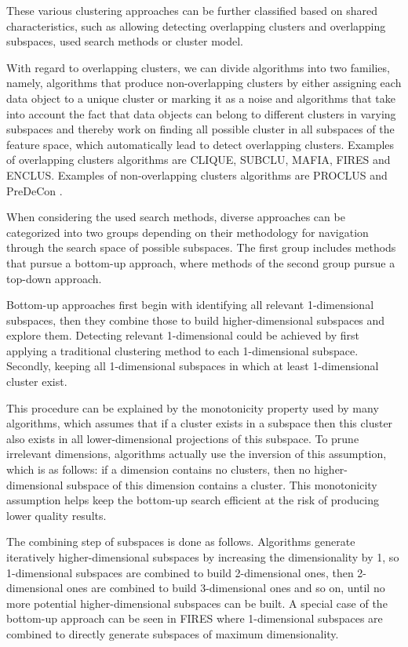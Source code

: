 These various clustering approaches can be further classified based on shared characteristics, such as allowing detecting overlapping clusters and overlapping subspaces, used search methods or cluster model.

With regard to overlapping clusters, we can divide algorithms into two families, namely, algorithms that produce non-overlapping clusters by either assigning each data object to a unique cluster or marking it as a noise and algorithms that take into account the fact that data objects can belong to different clusters in varying subspaces and thereby work on finding all possible cluster in all subspaces of the feature space, which automatically lead to detect overlapping clusters. Examples of overlapping clusters algorithms are CLIQUE, SUBCLU, MAFIA, FIRES and ENCLUS. Examples of non-overlapping clusters algorithms are PROCLUS and PreDeCon \citep{DBLP:conf/icdm/BohmKKK04}.

When considering the used search methods, diverse approaches can be categorized into two groups depending on their methodology for navigation through the search space of possible subspaces. The first group includes methods that pursue a bottom-up approach, where methods of the second group pursue a top-down approach. 

Bottom-up approaches first begin with identifying all relevant 1-dimensional subspaces, then they combine those to build higher-dimensional subspaces and explore them. Detecting relevant 1-dimensional could be achieved by first applying a traditional clustering method to each 1-dimensional subspace. Secondly, keeping all 1-dimensional subspaces in which at least 1-dimensional cluster exist. 

This procedure can be explained by the monotonicity property used by many algorithms, which assumes that if a cluster exists in a subspace then this cluster also exists in all lower-dimensional projections of this subspace. To prune irrelevant dimensions, algorithms actually use the inversion of this assumption, which is as follows: if a dimension contains no clusters, then no higher-dimensional subspace of this dimension contains a cluster. This monotonicity assumption helps keep the bottom-up search efficient at the risk of producing lower quality results.

The combining step of subspaces is done as follows. Algorithms generate iteratively higher-dimensional subspaces by increasing the dimensionality by 1, so 1-dimensional subspaces are combined to build 2-dimensional ones, then 2-dimensional ones are combined to build 3-dimensional ones and so on, until no more potential higher-dimensional subspaces can be built. A special case of the bottom-up approach can be seen in FIRES \citep{fires} where 1-dimensional subspaces are combined to directly generate subspaces of maximum dimensionality.

